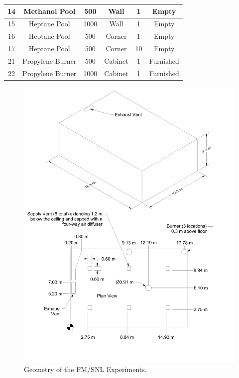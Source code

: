 \begin{table}[h!]
\begin{center}
\begin{tabular}{|c|c|c|c|c|c|}
14      & Methanol Pool     &     500       & Wall          & 1                 & Empty                  \\ \hline
15      & Heptane Pool      &    1000       & Wall          & 1                 & Empty                  \\ \hline
16      & Heptane Pool      &     500       & Corner        & 1                 & Empty                  \\ \hline
17      & Heptane Pool      &     500       & Corner        & 10                & Empty                  \\ \hline
21      & Propylene Burner  &     500       & Cabinet       & 1                 & Furnished              \\ \hline
22      & Propylene Burner  &    1000       & Cabinet       & 1                 & Furnished              \\ \hline
\end{tabular}
\end{center}
\label{FM_SNL_Matrix}
\end{table}



\begin{figure}[p]
\includegraphics[width=\textwidth]{FIGURES/FM_SNL/FM_SNL_Drawing}
\caption[Geometry of the FM/SNL Experiments]{Geometry of the FM/SNL Experiments.}
\label{FM_SNL_Drawing}
\end{figure}


